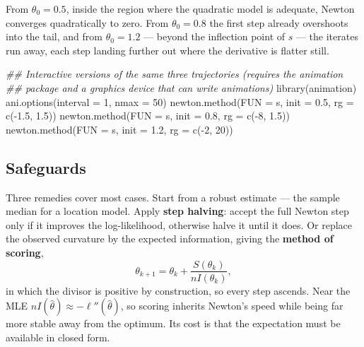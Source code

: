 \documentclass[
  letterpaper,
  DIV=11,
  numbers=noendperiod]{scrreprt}
\newenvironment{Shaded}{\begin{snugshade}}{\end{snugshade}}
\newcommand{\AttributeTok}[1]{\textcolor[rgb]{0.40,0.45,0.13}{#1}}
\newcommand{\DecValTok}[1]{\textcolor[rgb]{0.68,0.00,0.00}{#1}}
\newcommand{\DocumentationTok}[1]{\textcolor[rgb]{0.37,0.37,0.37}{\textit{#1}}}
\newcommand{\FloatTok}[1]{\textcolor[rgb]{0.68,0.00,0.00}{#1}}
\newcommand{\FunctionTok}[1]{\textcolor[rgb]{0.28,0.35,0.67}{#1}}
\newcommand{\NormalTok}[1]{\textcolor[rgb]{0.00,0.23,0.31}{#1}}
\newcommand{\SpecialCharTok}[1]{\textcolor[rgb]{0.37,0.37,0.37}{#1}}
\begin{document}
From \(\theta_0 = 0.5\), inside the region where the quadratic model is
adequate, Newton converges quadratically to zero. From
\(\theta_0 = 0.8\) the first step already overshoots into the tail, and
from \(\theta_0 = 1.2\) --- beyond the inflection point of \(s\) --- the
iterates run away, each step landing further out where the derivative is
flatter still.

\begin{Shaded}
\begin{Highlighting}[]
\DocumentationTok{\#\# Interactive versions of the same three trajectories (requires the animation}
\DocumentationTok{\#\# package and a graphics device that can write animations)}
\FunctionTok{library}\NormalTok{(animation)}
\FunctionTok{ani.options}\NormalTok{(}\AttributeTok{interval =} \DecValTok{1}\NormalTok{, }\AttributeTok{nmax =} \DecValTok{50}\NormalTok{)}
\FunctionTok{newton.method}\NormalTok{(}\AttributeTok{FUN =}\NormalTok{ s, }\AttributeTok{init =} \FloatTok{0.5}\NormalTok{, }\AttributeTok{rg =} \FunctionTok{c}\NormalTok{(}\SpecialCharTok{{-}}\FloatTok{1.5}\NormalTok{, }\FloatTok{1.5}\NormalTok{))}
\FunctionTok{newton.method}\NormalTok{(}\AttributeTok{FUN =}\NormalTok{ s, }\AttributeTok{init =} \FloatTok{0.8}\NormalTok{, }\AttributeTok{rg =} \FunctionTok{c}\NormalTok{(}\SpecialCharTok{{-}}\DecValTok{8}\NormalTok{, }\FloatTok{1.5}\NormalTok{))}
\FunctionTok{newton.method}\NormalTok{(}\AttributeTok{FUN =}\NormalTok{ s, }\AttributeTok{init =} \FloatTok{1.2}\NormalTok{, }\AttributeTok{rg =} \FunctionTok{c}\NormalTok{(}\SpecialCharTok{{-}}\DecValTok{2}\NormalTok{, }\DecValTok{20}\NormalTok{))}
\end{Highlighting}
\end{Shaded}

\subsection{Safeguards}\label{safeguards}

Three remedies cover most cases. Start from a robust estimate --- the
sample median for a location model. Apply \textbf{step halving}: accept
the full Newton step only if it improves the log-likelihood, otherwise
halve it until it does. Or replace the observed curvature by the
expected information, giving the \textbf{method of scoring},
\[\theta_{k+1} = \theta_k + \frac{S(\theta_k)}{n I(\theta_k)} ,\] in
which the divisor is positive by construction, so every step ascends.
Near the MLE \(nI(\hat\theta) \approx -\ell''(\hat\theta)\), so scoring
inherits Newton's speed while being far more stable away from the
optimum. Its cost is that the expectation must be available in closed
form.
\end{document}
